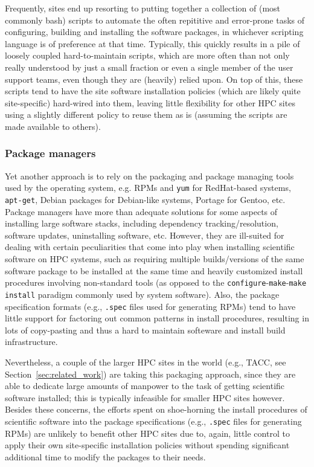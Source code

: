 Frequently, sites end up resorting to putting together a collection of (most
commonly bash) scripts to automate the often repititive and error-prone tasks of
configuring, building and installing the software packages, in whichever scripting
language is of preference at that time. Typically, this quickly results in a pile of
loosely coupled hard-to-maintain scripts, which are more often than not only really
understood by just a small fraction or even a single member of the user support
teams, even though they are (heavily) relied upon.
On top of this, these scripts
tend to have the site software installation policies (which are likely quite
site-specific) hard-wired into them, leaving little flexibility for other HPC
sites using a slightly different policy to reuse them as is (assuming the scripts
are made available to others).

\subsubsection{Package managers}

Yet another approach is to rely on the packaging and package managing tools used
by the operating system, e.g. RPMs and \texttt{yum} for RedHat-based systems,
\texttt{apt-get}, Debian packages for Debian-like systems, Portage for Gentoo, etc.
Package managers have more than adequate solutions for some aspects of
installing large software stacks, including dependency tracking/resolution, software
updates, uninstalling software, etc. However, they are ill-suited for dealing with
certain peculiarities that come into play when installing scientific software on
HPC systems, such as requiring multiple builds/versions of the same software package
to be installed at the same time and heavily customized install procedures involving
non-standard tools (as opposed to the
\texttt{configure}-\texttt{make}-\texttt{make install} paradigm commonly used by
system software). Also, the package specification formats (e.g., \texttt{.spec}
files used for generating RPMs) tend to have little support for factoring out
common patterns in install procedures, resulting in lots of copy-pasting and thus
a hard to maintain softeware and install build infrastructure.

Nevertheless, a couple of the larger HPC sites in the world
(e.g., TACC, see Section~\ref{sec:related_work}) are taking this packaging approach,
since they are able to dedicate large amounts of manpower to the task of getting
scientific software installed; this is typically infeasible for smaller HPC sites
however. Besides these concerns, the efforts spent on shoe-horning the install
procedures of scientific software into the package specifications (e.g., 
\texttt{.spec} files for generating RPMs) are unlikely to benefit other HPC sites
due to, again, little control to apply their own site-specific installation
policies without spending significant additional time to modify the packages to
their needs.

